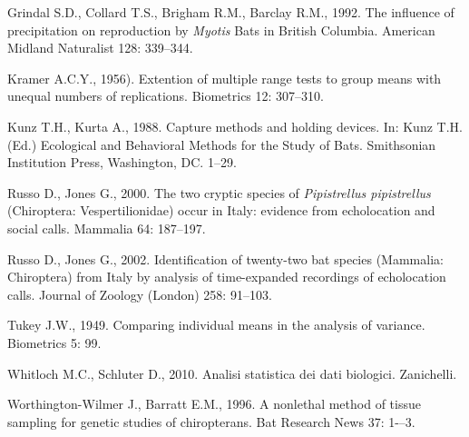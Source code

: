 \begin{multicols}{2}
\begin{small}
Grindal  S.D.,  Collard T.S., Brigham R.M.,  Barclay R.M., 1992. The influence of precipitation on  reproduction by  \emph{Myotis} Bats in British Columbia. American Midland Naturalist 128: 339--344.

Kramer A.C.Y., 1956). Extention of multiple range tests to group means with unequal numbers of replications. Biometrics 12: 307--310.

Kunz T.H., Kurta A., 1988. Capture methods and holding devices. In: Kunz T.H. (Ed.) Ecological and Behavioral Methods for the Study of Bats. Smithsonian Institution Press, Washington, DC. 1--29.
 
Russo D., Jones G., 2000. The two cryptic species of \emph{Pipistrellus pipistrellus} (Chiroptera: Vespertilionidae) occur in Italy: evidence from echolocation and social calls. Mammalia 64: 187--197.

Russo D., Jones G., 2002. Identification  of  twenty-two bat species  (Mammalia: Chiroptera)  from Italy by analysis  of  time-expanded  recordings  of echolocation calls. Journal of Zoology (London)  258: 91--103.
 
Tukey J.W., 1949. Comparing individual means in the analysis of variance. Biometrics 5: 99.

Whitloch M.C., Schluter D., 2010. Analisi statistica dei dati biologici. Zanichelli.

Worthington-Wilmer J., Barratt E.M., 1996. A nonlethal method of tissue sampling for genetic studies of chiropterans. Bat Research News 37: 1-–3. 

\end{small}

\end{multicols}
